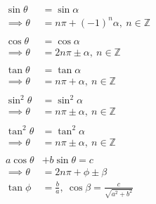 \documentclass[12pt]{article}
\title{}
\author{}
\date{}
\begin{document}
	
	\maketitle

	\begin{align}
		\sin \theta &= \sin \alpha \nonumber \\
		\implies \theta &= n\pi + (-1)^n\alpha,\ n \in \mathbb{Z} \\
		\nonumber \\
		\cos \theta &= \cos \alpha \nonumber \\
		\implies \theta &= 2n\pi \pm \alpha,\ n \in \mathbb{Z} \\
		\nonumber \\
		\tan\theta &= \tan \alpha \nonumber \\
		\implies \theta &= n\pi + \alpha,\ n \in \mathbb{Z} \\
		\nonumber \\
		\sin^2\theta &= \sin^2\alpha \nonumber \\
		\implies \theta &= n\pi \pm \alpha,\ n \in \mathbb{Z} \\
		\nonumber \\
		\tan^2\theta &= \tan^2\alpha \nonumber \\
		\implies \theta &= n\pi \pm \alpha,\ n \in \mathbb{Z} \\
		\nonumber \\
		a\cos\theta &+ b\sin\theta = c \nonumber \\
		\implies \theta &= 2n\pi + \phi \pm \beta \\
		\tan\phi &= \frac{b}{a},\ \cos\beta = \frac{c}{\sqrt{a^2+b^2}} \nonumber
	\end{align}
\end{document}
